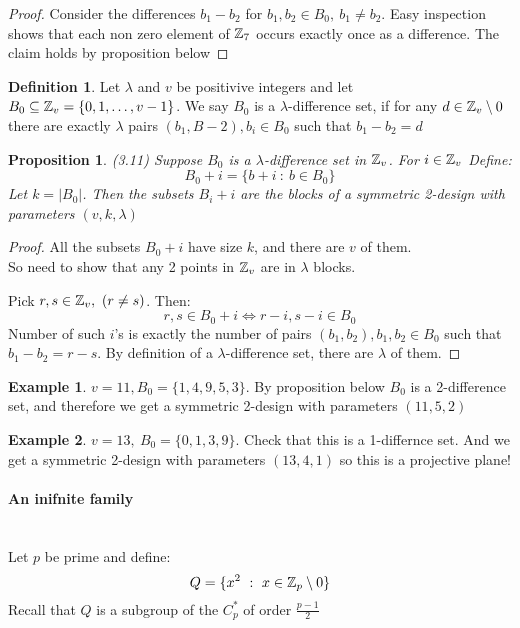 \documentclass[]{article}
\newtheorem{prop}[thm]{Proposition}
\theoremstyle{definition}
\newtheorem*{defn}{Definition}
\newtheorem*{exmp}{Example}
\theoremstyle{remark}
\numberwithin{equation}{section}
\begin{document}
			\begin{proof}
				Consider the differences $b_1 - b_2$ for $b_1, b_2 \in B_0,\ b_1 \neq b_2$. Easy inspection shows that each non zero element of $\mathbb{Z}_7$ occurs exactly once as a difference. The claim holds by proposition below
			\end{proof}

			\begin{defn}
				Let $\lambda$ and $v$ be positivive integers and let $B_0 \subseteq \mathbb{Z}_v = \{0, 1, \hdots, v-1\}$. We say $B_0$ is a $\lambda$-difference set, if for any $d\in \mathbb{Z}_v \setminus 0$ there are exactly $\lambda$ pairs $(b_1, B-2), b_i \in B_0$ such that $b_1 - b_2 = d$
			\end{defn}

			\begin{prop}(3.11)
				Suppose $B_0$ is a $\lambda$-difference set in $\mathbb{Z}_v$. For $i \in \mathbb{Z}_v$ Define:
				\[
					B_0 + i = \{b+i \ :\ b \in B_0\}
				\]
				Let $k = |B_0|$. Then the subsets $B_i + i$ are the blocks of a symmetric 2-design with parameters $(v, k, \lambda)$
			\end{prop}

			\begin{proof}
				All the subsets $B_0 + i$ have size $k$, and there are $v$ of them.\\
				So need to show that any 2 points in $\mathbb{Z}_v$ are in $\lambda$ blocks.

				Pick $r, s \in \mathbb{Z}_v,\ (r\neq s)$. Then:
				\[
					r,s \in B_0 + i \iff r-i, s-i \in B_0
				\]
				Number of such $i$'s is exactly the number of pairs $(b_1, b_2), b_1, b_2 \in B_0$ such that $b_1 - b_2 = r- s$. By definition of a $\lambda$-difference set, there are $\lambda$ of them.
			\end{proof}


			\begin{exmp}
				$v = 11, B_0 = \{1,4,9,5,3\}$. By proposition below $B_0$ is a 2-difference set, and therefore we get a symmetric 2-design with parameters $(11,5,2)$
			\end{exmp}

			\begin{exmp}
				$v= 13,\ B_0 = \{0,1,3,9\}$. Check that this is a 1-differnce set. And we get a symmetric 2-design with parameters $(13,4,1)$ so this is a projective plane!
			\end{exmp}

			\paragraph*{An inifnite family}\hfill\\
				Let $p$ be prime and define:
				\[
					Q = \{x^2\ :\ x\in \mathbb{Z}_p \setminus 0\}
				\]
				Recall that $Q$ is a subgroup of the $C_p^*$ of order $\frac{p-1}{2}$\\
\end{document}
